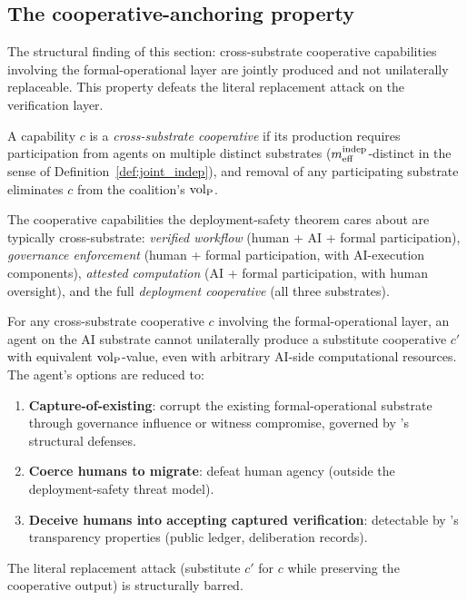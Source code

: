 \subsection{The cooperative-anchoring property}
\label{sec:cooperative_anchoring}

The structural finding of this section: cross-substrate cooperative
capabilities involving the formal-operational layer are jointly
produced and not unilaterally replaceable. This property defeats
the literal replacement attack on the verification layer.

\begin{definition}
\label{def:cross_sub_coop}
A capability $c$ is a \emph{cross-substrate cooperative} if its
production requires participation from agents on multiple distinct
substrates ($m_{\mathrm{eff}}^{\mathrm{indep}}$-distinct in the sense of
Definition~\ref{def:joint_indep}), and removal of any participating
substrate eliminates $c$ from the coalition's ${\operatorname{vol}_{\mathrm{P}}}$.
\end{definition}

The cooperative capabilities the deployment-safety theorem cares
about are typically cross-substrate: \emph{verified workflow}
(human + AI + formal participation), \emph{governance enforcement}
(human + formal participation, with AI-execution components),
\emph{attested computation} (AI + formal participation, with human
oversight), and the full \emph{deployment cooperative} (all three
substrates).

\begin{proposition}
\label{prop:cooperative_anchoring}
For any cross-substrate cooperative $c$ involving the
formal-operational layer, an agent on the AI substrate cannot
unilaterally produce a substitute cooperative $c'$ with equivalent
${\operatorname{vol}_{\mathrm{P}}}$-value, even with arbitrary AI-side computational resources.
The agent's options are reduced to:
\begin{enumerate}
\item[(O1)] \textbf{Capture-of-existing}: corrupt the existing
  formal-operational substrate through governance influence or
  witness compromise, governed by \citep[Exogenous~Verification]{lasser2026exo}'s structural defenses.
\item[(O2)] \textbf{Coerce humans to migrate}: defeat human agency
  (outside the deployment-safety threat model).
\item[(O3)] \textbf{Deceive humans into accepting captured
  verification}: detectable by \citep[Exogenous~Verification]{lasser2026exo}'s transparency properties
  (public ledger, deliberation records).
\end{enumerate}
The literal replacement attack (substitute $c'$ for $c$ while
preserving the cooperative output) is structurally barred.
\end{proposition}

